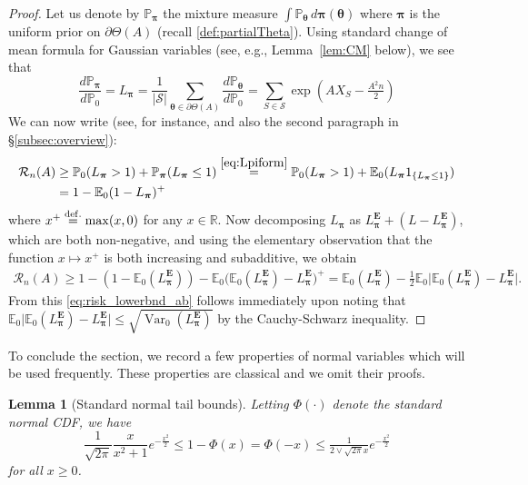 \documentclass[11pt,reqno,letterpaper]{amsart}
\numberwithin{equation}{section}
\theoremstyle{plain}
\newtheorem{lemma}[theorem]{Lemma}
\def \btheta{\boldsymbol{\theta}}
\def \bpi{\boldsymbol{\pi}}
\def \E{\mathbb{E}}
\def \P{\mathbb{P}}
\def \R{\mathbb{R}}
\providecommand{\var}{\operatorname{Var}}
\providecommand{\bE}{\mathbf E}
\begin{document}
\begin{proof}
Let us denote by $\P_{\bpi}$ the mixture measure $\int \P_{\btheta} \, d\bpi(\btheta)$ where $\bpi$ is the uniform prior on $\partial \Theta(A)$ (recall \eqref{def:partialTheta}). Using standard change of mean formula for Gaussian 
variables (see, e.g., Lemma~\ref{lem:CM} below), we see that
\begin{equation}\label{eq:Lpiform}
\frac{d \P_{\bpi}}{d\P_0} = L_{\bpi} = \frac{1}{|\mathcal S|} \sum_{\btheta \in \partial \Theta(A)} \frac {d\P_{\btheta}}{d\P_0} = \sum_{S \in \mathcal S} \exp\left(A X_S - \tfrac{A^2n}{2}\right)
\end{equation}
We can now write (see, for instance, \cite[Section~5.1]{butuceasubmatrix2013} and also the second paragraph in \S\ref{subsec:overview}):
\begin{equation}\label{eq:NPearson}
\begin{split}
\mathcal R_n(A) &\ge \P_0(L_{\bpi} > 1) + \P_{\bpi}(L_{\bpi} \le 1) \stackrel{\eqref{eq:Lpiform}}{=} \P_0(L_{\bpi} > 1) + \E_0(L_{\bpi}1_{\{L_{\bpi} \le 1\}}) \\
&= 1 -  \E_0(1 - L_{\bpi})^+
\end{split}
\end{equation}
where $x^+ \stackrel{{\rm def.}}{=} \max(x, 0)$ for any $x \in \R$. Now decomposing $L_{\bpi}$ as $L_{\bpi}^{\bE} + (L - L_{\bpi}^{\bE})$, 
which are both non-negative, and using the elementary observation that the 
function $x \mapsto x^+$ is both increasing and subadditive, we obtain
\begin{equation*}
\begin{split}
\mathcal R_n(A) \ge 1 -  (1 - \E_0(L_{\bpi}^{\bE})) -\E_0\big(\E_0(L_{\bpi}^{\bE}) - L_{\bpi}^{\bE}\big)^+ = \E_0(L_{\bpi}^{\bE}) - \frac12 \E_0\big|\E_0(L_{\bpi}^{\bE}) - L_{\bpi}^{\bE}|.
\end{split}    
\end{equation*}
From this \eqref{eq:risk_lowerbnd_ab} follows immediately upon noting that 
$\E_0\big|\E_0(L_{\bpi}^{\bE}) - L_{\bpi}^{\bE}| \le \sqrt{\var_0(L_{\bpi}^{\bE})}$ 
by the Cauchy-Schwarz inequality.
\end{proof}
To conclude the section, we record a few properties of normal variables 
which will be used frequently. These properties are classical and we omit their 
proofs.
\begin{lemma}[Standard normal tail bounds]\label{lem:normal_tailbnd}
Letting $\Phi(\cdot)$ denote the standard normal CDF, we have
\begin{equation}\label{eq:normal_tailbnd}
\frac{1}{\sqrt{2\pi}}\frac{x}{x^2 + 1}e^{-\frac{x^2}{2}} \le 1 - \Phi(x) = \Phi(-x) \le \tfrac 1{2\vee \sqrt{2\pi}x} e^{-\frac{x^2}{2}}
\end{equation}
for all $x \ge 0$.
\end{lemma}
\end{document}
